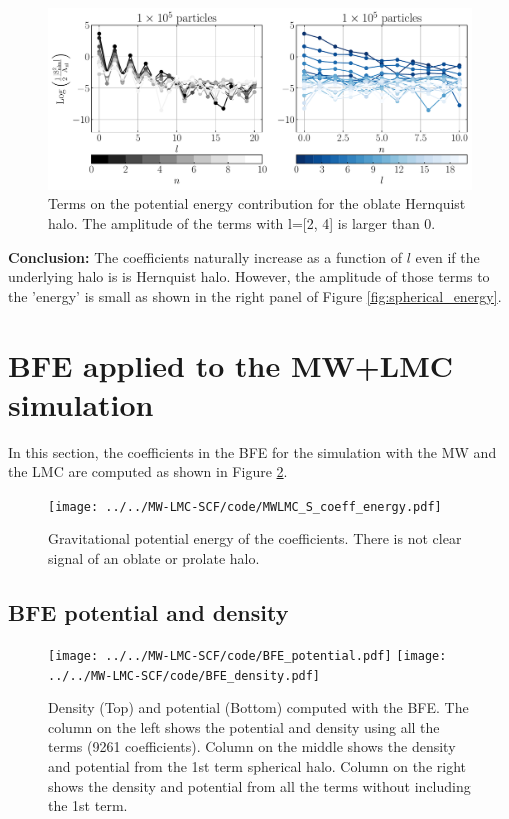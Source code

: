 \documentclass[14pt]{article}
\begin{document}
\begin{figure}[H]
  \centering
  \includegraphics[scale=0.5]{../code/energy_terms_oblate_hern_a_40_1E5.pdf}
  \caption{Terms on the potential energy contribution for the oblate Hernquist halo.
The amplitude of the terms with l=[2, 4] is larger than 0.} \label{fig:energy_oblate}
\end{figure}




\textbf{Conclusion:} The coefficients naturally increase as a function of $l$
even if the underlying halo is is Hernquist halo. However, the amplitude of those terms
to the 'energy' is small as shown in the right panel of Figure \ref{fig:spherical_energy}.\\

\section{BFE applied to the MW+LMC simulation}

In this section, the coefficients in the BFE for the simulation with the MW and
the LMC are computed as shown in Figure \ref{fig:MW_LMC_coeff}.

\begin{figure}[H]
  \centering
  \texttt{[image: ../../MW-LMC-SCF/code/MWLMC\_S\_coeff\_energy.pdf]}
  \caption{Gravitational potential energy of the coefficients. There
  is not clear signal of an oblate or prolate halo.}\label{fig:MW_LMC_coeff}
\end{figure}


\subsection{BFE potential and density}


\begin{figure}[H]
  \centering
  \texttt{[image: ../../MW-LMC-SCF/code/BFE\_potential.pdf]}
  \texttt{[image: ../../MW-LMC-SCF/code/BFE\_density.pdf]}
  \caption{Density (Top) and potential (Bottom) computed with the BFE. The
  column on the left shows the potential and density using all the terms (9261
  coefficients). Column on the middle shows the density and potential from the
  1st term spherical halo. Column on the right shows the density and potential
  from all the terms without including the 1st term.}

\end{figure}
\end{document}
